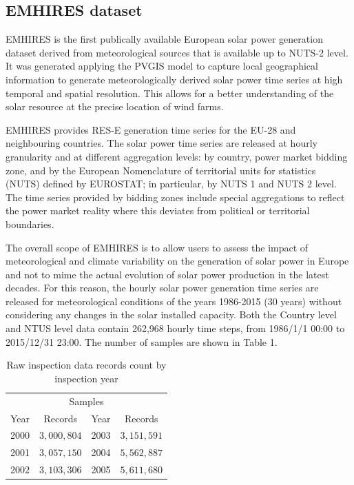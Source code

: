 \documentclass{article}
\begin{document}
\subsection{EMHIRES dataset}
EMHIRES is the first publically available European solar power generation dataset derived from meteorological sources that is available up to NUTS-2 level. It was generated applying the PVGIS model to capture local geographical information to generate meteorologically derived solar power time series at high temporal and spatial resolution. This allows for a better understanding of the solar resource at the precise location of wind farms.

EMHIRES provides RES-E generation time series for the EU-28 and neighbouring countries. The solar power time series are released at hourly granularity and at different aggregation levels: by country, power market bidding zone, and by the European Nomenclature of territorial units for statistics (NUTS) defined by EUROSTAT; in particular, by NUTS 1 and NUTS 2 level. The time series provided by bidding zones include special aggregations to reflect the power market reality where this deviates from political or territorial boundaries.

The overall scope of EMHIRES is to allow users to assess the impact of meteorological and climate variability on the generation of solar power in Europe and not to mime the actual evolution of solar power production in the latest decades. For this reason, the hourly solar power generation time series are released for meteorological conditions of the years 1986-2015 (30 years) without considering any changes in the solar installed capacity. Both the Country level and NTUS level data contain
262,968 hourly time steps, from 1986/1/1 00:00 to 2015/12/31 23:00. The number of samples are shown in Table 1.

\begin{table}
  \caption{Raw inspection data records count by inspection year}
  \label{obd data}
  \centering
  \begin{tabular}{cccc}
    \toprule
    \multicolumn{4}{c}{Samples}                   \\
    \cmidrule(r){1-4}
    Year & Records & Year & Records      \\
    \midrule
    2000 & $3,000,804$ & 2003 & $3,151,591$     \\
    2001 & $3,057,150$ & 2004 & $5,562,887$       \\
    2002 & $3,103,306$ & 2005 & $5,611,680$      \\
    \bottomrule
  \end{tabular}
\end{table}
\end{document}
